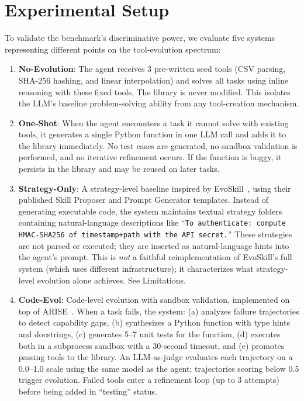 \documentclass[sigplan,nonacm,natbib=false]{acmart}
\begin{document}
\section{Experimental Setup}
\label{sec:exp_setup}

To validate the benchmark's discriminative power, we evaluate five systems representing different points on the tool-evolution spectrum:

\begin{enumerate}
\item \textbf{No-Evolution}: The agent receives 3 pre-written seed tools (CSV parsing, SHA-256 hashing, and linear interpolation) and solves all tasks using inline reasoning with these fixed tools. The library is never modified. This isolates the LLM's baseline problem-solving ability from any tool-creation mechanism.

\item \textbf{One-Shot}: When the agent encounters a task it cannot solve with existing tools, it generates a single Python function in one LLM call and adds it to the library immediately. No test cases are generated, no sandbox validation is performed, and no iterative refinement occurs. If the function is buggy, it persists in the library and may be reused on later tasks.

\item \textbf{Strategy-Only}: A strategy-level baseline inspired by EvoSkill~\cite{alzubi2026evoskill}, using their published Skill Proposer and Prompt Generator templates. Instead of generating executable code, the system maintains textual strategy folders containing natural-language descriptions like ``\texttt{To authenticate: compute HMAC-SHA256 of timestamp+path with the API secret.}'' These strategies are not parsed or executed; they are inserted as natural-language hints into the agent's prompt. This is \emph{not} a faithful reimplementation of EvoSkill's full system (which uses different infrastructure); it characterizes what strategy-level evolution alone achieves. See Limitations.

\item \textbf{Code-Evol}: Code-level evolution with sandbox validation, implemented on top of ARISE~\cite{kaliyev2026arise}. When a task fails, the system: (a) analyzes failure trajectories to detect capability gaps, (b) synthesizes a Python function with type hints and docstrings, (c) generates 5--7 unit tests for the function, (d) executes both in a subprocess sandbox with a 30-second timeout, and (e) promotes passing tools to the library. An LLM-as-judge evaluates each trajectory on a 0.0--1.0 scale using the same model as the agent; trajectories scoring below 0.5 trigger evolution. Failed tools enter a refinement loop (up to 3 attempts) before being added in ``testing'' status.


\end{enumerate}
\end{document}
